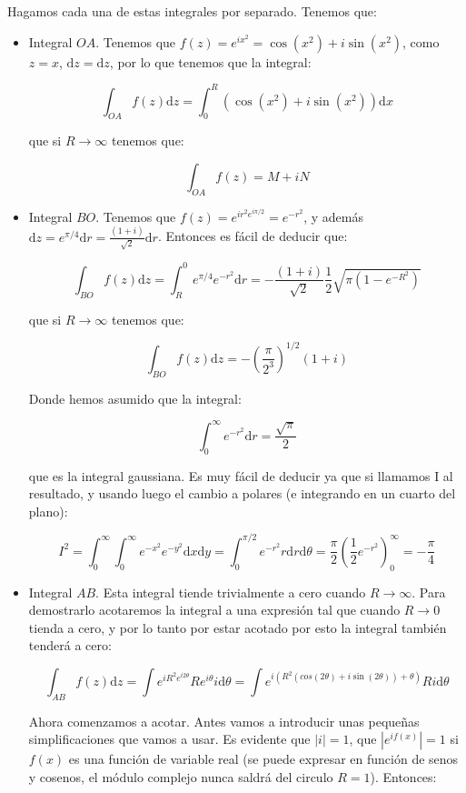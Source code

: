 \documentclass[12pt]{book}
\newcommand{\parentesis}[1]{\left( #1  \right)}
\newcommand{\D}{\mathrm{d}}
\newcommand{\into}{\int_{0}^{\infty}}
\begin{document}
Hagamos cada una de estas integrales por separado. Tenemos que:

\begin{itemize}
\item Integral $OA$. Tenemos que $f(z) = e^{ix^2} = \cos (x^2) + i \sin (x^2)$, como $z = x$, $\D z = \D z$, por lo que tenemos que la integral:

$$ \int_{OA} f(z) \D z = \int_{0}^{R} (\cos (x^2) + i \sin (x^2)) \D x   $$

que si $R \rightarrow \infty$ tenemos que:

$$ \int_{OA} f(z) = M + iN  $$

\item Integral $BO$. Tenemos que $f(z) = e^{i r^2 e^{i \pi/2}} = e^{-r^2}$, y además $\D z = e^{\pi/4}  \D r = \frac{(1+i)}{\sqrt{2}} \D r$. Entonces es fácil de deducir que:

$$ \int_{BO} f(z)\D z = \int_R^0 e^{\pi/4} e^{-r^2} \D r = - \dfrac{(1+i)}{\sqrt{2}} \dfrac{1}{2} \sqrt{\pi(1-e^{-R^2})} $$

que si $R \rightarrow \infty$ tenemos que:

$$ \int_{BO} f(z)\D z  =  -  \parentesis{\dfrac{\pi}{2^3}}^{1/2}   \parentesis{1 + i}  $$

Donde hemos asumido que la integral:

$$ \into e^{-r^2} \D r = \dfrac{\sqrt{\pi}}{2}  $$

que es la integral gaussiana. Es muy fácil de deducir ya que si llamamos I al resultado, y usando luego el cambio a polares (e integrando en un cuarto del plano):

$$ I^2 = \into  \into e^{-x^2} e^{-y^2} \D x \D y = \int_{0}^{\pi/2} e^{-r^2} r \D r \D \theta = \dfrac{\pi}{2} \parentesis{\dfrac{1}{2} e^{-r{^2}}}_{0}^\infty = - \dfrac{\pi}{4} $$

\item Integral $AB$. Esta integral tiende trivialmente a cero cuando $R \rightarrow \infty$. Para demostrarlo acotaremos la integral a una expresión tal que cuando $R \rightarrow 0$ tienda a cero, y por lo tanto por estar acotado por esto la integral también tenderá a cero:

$$ \int_{AB} f(z) \D z = \int e^{i R^2 e^{i 2 \theta}} R e^{i \theta} i \D \theta = \int e^{i (R^2 (cos (2 \theta) + i \sin (2 \theta))+\theta)} R i \D \theta  $$

Ahora comenzamos a acotar. Antes vamos a introducir unas pequeñas simplificaciones que vamos a usar. Es evidente que $|i|=1$, que $|e^{i f(x)}| = 1$ si $f(x)$ es una función de variable real (se puede expresar en función de senos y cosenos, el módulo complejo nunca saldrá del circulo $R = 1$). Entonces:


\end{itemize}
\end{document}
